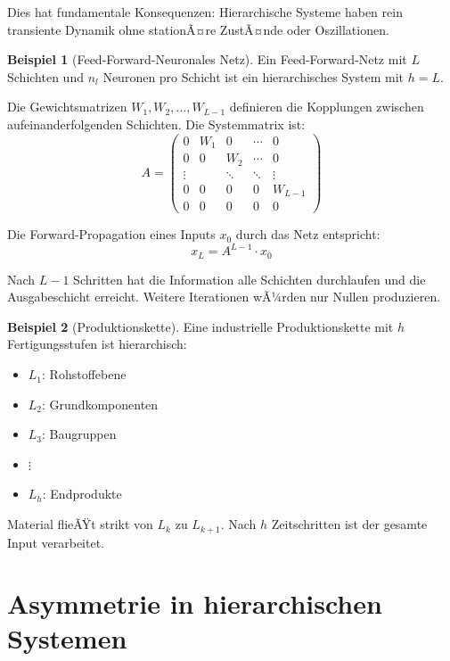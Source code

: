 ﻿\documentclass[a4paper,12pt]{report}
\theoremstyle{definition}
\newtheorem{beispiel}{Beispiel}
\begin{document}
	Dies hat fundamentale Konsequenzen: Hierarchische Systeme haben rein transiente Dynamik ohne stationÃ¤re ZustÃ¤nde oder Oszillationen.
	
	\begin{beispiel}[Feed-Forward-Neuronales Netz]
		Ein Feed-Forward-Netz mit $L$ Schichten und $n_l$ Neuronen pro Schicht ist ein hierarchisches System mit $h = L$.
		
		Die Gewichtsmatrizen $W_1, W_2, \ldots, W_{L-1}$ definieren die Kopplungen zwischen aufeinanderfolgenden Schichten. Die Systemmatrix ist:
		\[
		A = \begin{pmatrix}
			0 & W_1 & 0 & \cdots & 0 \\
			0 & 0 & W_2 & \cdots & 0 \\
			\vdots & & \ddots & \ddots & \vdots \\
			0 & 0 & 0 & 0 & W_{L-1} \\
			0 & 0 & 0 & 0 & 0
		\end{pmatrix}
		\]
		
		Die Forward-Propagation eines Inputs $x_0$ durch das Netz entspricht:
		\[
		x_L = A^{L-1} \cdot x_0
		\]
		
		Nach $L-1$ Schritten hat die Information alle Schichten durchlaufen und die Ausgabeschicht erreicht. Weitere Iterationen wÃ¼rden nur Nullen produzieren.
	\end{beispiel}
	
	\begin{beispiel}[Produktionskette]
		Eine industrielle Produktionskette mit $h$ Fertigungsstufen ist hierarchisch:
		\begin{itemize}
			\item $L_1$: Rohstoffebene
			\item $L_2$: Grundkomponenten
			\item $L_3$: Baugruppen
			\item $\vdots$
			\item $L_h$: Endprodukte
		\end{itemize}
		
		Material flieÃŸt strikt von $L_k$ zu $L_{k+1}$. Nach $h$ Zeitschritten ist der gesamte Input verarbeitet.
	\end{beispiel}
	
	\section{Asymmetrie in hierarchischen Systemen}
	
\end{document}
